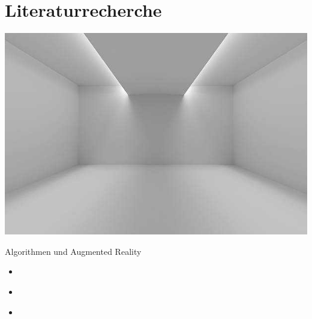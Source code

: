 \documentclass[presentation,bigger,aspectratio=169]{beamer}
\begin{document}
\section{Literaturrecherche}
\label{sec:org8125ecf}
\begin{frame}[label={sec:orgeb26992}]{\MakeUppercase{\insertsection}}
\begin{center}
\begin{center}
\includegraphics[height=0.77\textheight]{./img/m1_praes_empty_01.jpg}
\label{fig:m1_praes_empty_01}
\end{center}
\end{center}
\end{frame}

\begin{frame}[label={sec:org9c125a8}]{Algorithmen und Augmented Reality}
\begin{itemize}
\item \textcite{kanAutomatedInteriorDesign2017}
\item \textcite{sanduAugmentedRealityUses2018}
\item \textcite{moaresInterARInterior2020}
\end{itemize}
\end{frame}
\end{document}
